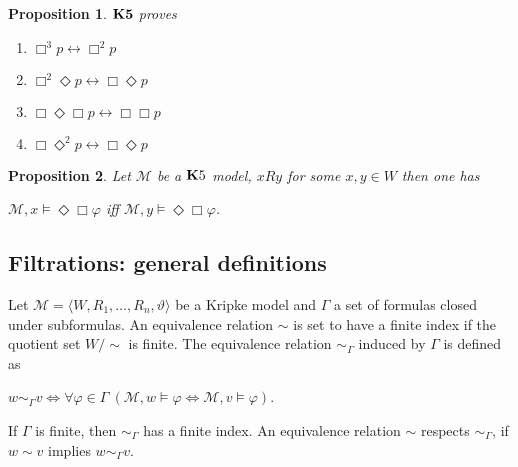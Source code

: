 \documentclass[a4paper]{article}
\theoremstyle{defin}
\theoremstyle{theorem}
\theoremstyle{prop}
\newtheorem{prop}{Proposition}
\theoremstyle{lemma}
\theoremstyle{ex}
\theoremstyle{col}
\begin{document}
\begin{prop} \label{K5proves}
  ${\bf K5}$ proves
  \begin{enumerate}
    \item $\Box^3 p \leftrightarrow \Box^2 p$
    \item $\Box^2 \Diamond p \leftrightarrow \Box \Diamond p$
    \item $\Box \Diamond \Box p \leftrightarrow \Box \Box p$
    \item $\Box \Diamond^2 p \leftrightarrow \Box \Diamond p$
  \end{enumerate}
\end{prop}

\begin{prop}
  Let $\mathcal{M}$ be a ${\bf K}5$ model, $x R y$ for some $x, y \in W$ then one has
  \begin{center}
    $\mathcal{M}, x \models \Diamond \Box \varphi$ iff $\mathcal{M}, y \models \Diamond \Box \varphi$.
  \end{center}
\end{prop}

\subsection{Filtrations: general definitions}

Let $\mathcal{M} = \langle W, R_1, \dots, R_n, \vartheta \rangle$ be a Kripke model and $\Gamma$ a set of formulas closed under subformulas. An equivalence relation $\sim$ is set to have a finite index if the quotient set $W / \sim$ is finite. The equivalence relation $\sim_{\Gamma}$ induced by $\Gamma$ is defined as

\begin{center}
  $w \sim_{\Gamma} v \Leftrightarrow \forall \varphi \in \Gamma \: (\mathcal{M}, w \models \varphi \Leftrightarrow \mathcal{M}, v \models \varphi)$.
\end{center}

If $\Gamma$ is finite, then $\sim_{\Gamma}$ has a finite index. An equivalence relation $\sim$ respects $\sim_{\Gamma}$, if $w \sim v$ implies $w \sim_{\Gamma} v$.
\end{document}
